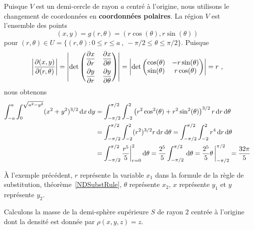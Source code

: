 {\begin{egg}
Puisque $V$ est un demi-cercle de rayon $a$ centré à l'origine, nous
utilisons le changement de coordonnées en
{\bfseries coordonnées polaires}.
La région $V$ est l'ensemble des points
\[
  (x,y) = g(r,\theta) = (r \cos(\theta),r \sin(\theta))
\]
pour
$(r,\theta) \in U = \{ (r,\theta) : 0 \leq r \leq a \ , \ -\pi/2 \leq \theta
\leq \pi/2 \}$.
Puisque
\[
\left| \frac{\partial(x,y)}{\partial(r,\theta)} \right| = 
  \left| \det \begin{pmatrix}
  \displaystyle \frac{\partial x}{\partial r} & \displaystyle \frac{\partial x}{\partial \theta}\\[0.8em]
  \displaystyle \frac{\partial y}{\partial r} & \displaystyle \frac{\partial y}{\partial \theta} 
  \end{pmatrix} \right|
= \left| \det \begin{pmatrix}
\cos(\theta) & -r \sin(\theta) \\
\sin(\theta) & r \cos(\theta)
  \end{pmatrix}\right|  = r \ ,
\]
nous obtenons
\begin{align*}
\int_{-a}^a \int_0^{\sqrt{a^2-y^2}} (x^2 + y^2)^{3/2} \,\mathrm{d}x \,\mathrm{d}y
&= \int_{-\pi/2}^{\pi/2} \int_{-2}^2 \left(r^2\cos^2(\theta) + r^2
   \sin^2(\theta)\right)^{3/2} r \,\mathrm{d}r\,\mathrm{d}\theta \\
&= \int_{-\pi/2}^{\pi/2} \int_{-2}^2 (r^2)^{3/2} r \,\mathrm{d}r \,\mathrm{d}\theta
=  \int_{-\pi/2}^{\pi/2} \int_{-2}^2 r^4 \,\mathrm{d}r \,\mathrm{d}\theta \\
&= \int_{-\pi/2}^{\pi/2} \frac{r^5}{5}\bigg|_{r=0}^{2} \,\mathrm{d}\theta
= \frac{2^5}{5} \int_{-\pi/2}^{\pi/2} \,\mathrm{d}\theta
= \frac{2^5}{5} \theta\, \bigg|_{-\pi/2}^{\pi/2} = \frac{32\pi}{5}
\end{align*}
\label{SubstNDEgg1Text}
\end{egg}

\begin{rmk}
À l'exemple précédent, $r$ représente la variable $x_1$ dans la
formule de la règle de substitution, théorème~\ref{NDSubstRule},
$\theta$ représente $x_2$, $x$ représente $y_1$ et $y$ représente
$y_2$.
\end{rmk}

\begin{egg}
Calculons la masse de la demi-sphère supérieure $S$ de rayon $2$ centrée à
l'origine dont la densité est donnée par $\rho(x,y,z) = z$.


\end{egg}}
